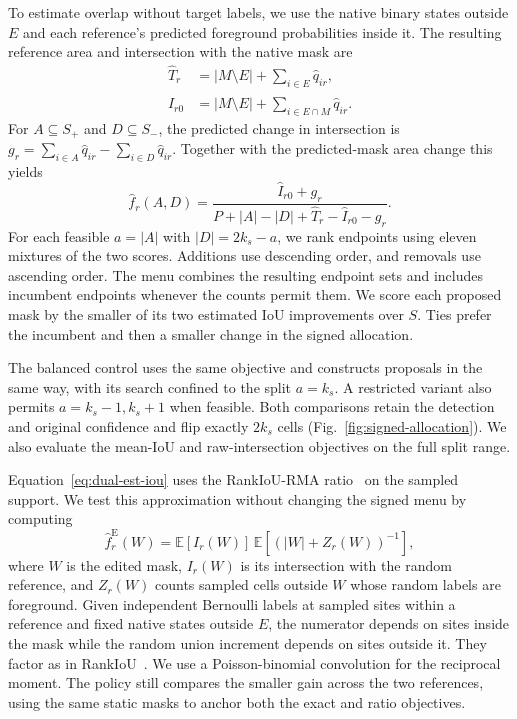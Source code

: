 \documentclass[journal]{IEEEtran}
\begin{document}
To estimate overlap without target labels, we use the native binary states outside \(E\) and each reference's predicted foreground probabilities inside it. The resulting reference area and intersection with the native mask are
\begin{equation}
\begin{aligned}
 \hat T_r&=|M\setminus E|+\sum_{i\in E}\hat q_{ir},\\
 \hat I_{r0}&=|M\setminus E|+\sum_{i\in E\cap M}\hat q_{ir}.
\end{aligned}
\label{eq:dual-area-proxy}
\end{equation}
For \(A\subseteq S_+\) and \(D\subseteq S_-\), the predicted change in intersection is \(g_r=\sum_{i\in A}\hat q_{ir}-\sum_{i\in D}\hat q_{ir}\). Together with the predicted-mask area change this yields
\begin{equation}
 \hat f_r(A,D)=
 \frac{\hat I_{r0}+g_r}{P+|A|-|D|+\hat T_r-\hat I_{r0}-g_r}.
 \label{eq:dual-est-iou}
\end{equation}
For each feasible \(a=|A|\) with \(|D|=2k_s-a\), we rank endpoints using eleven mixtures of the two scores. Additions use descending order, and removals use ascending order. The menu combines the resulting endpoint sets and includes incumbent endpoints whenever the counts permit them. We score each proposed mask by the smaller of its two estimated IoU improvements over \(S\). Ties prefer the incumbent and then a smaller change in the signed allocation.

The balanced control uses the same objective and constructs proposals in the same way, with its search confined to the split \(a=k_s\). A restricted variant also permits \(a=k_s-1,k_s+1\) when feasible. Both comparisons retain the detection and original confidence and flip exactly \(2k_s\) cells (Fig.~\ref{fig:signed-allocation}). We also evaluate the mean-IoU and raw-intersection objectives on the full split range.

Equation~\eqref{eq:dual-est-iou} uses the RankIoU-RMA ratio~\cite{rankrma} on the sampled support. We test this approximation without changing the signed menu by computing
\begin{equation}
 \hat f^{\mathrm{E}}_r(W)=\mathbb{E}[I_r(W)]\,
     \mathbb{E}\!\left[(|W|+Z_r(W))^{-1}\right],
 \label{eq:exact-iou-signed}
\end{equation}
where \(W\) is the edited mask, \(I_r(W)\) is its intersection with the random reference, and \(Z_r(W)\) counts sampled cells outside \(W\) whose random labels are foreground. Given independent Bernoulli labels at sampled sites within a reference and fixed native states outside \(E\), the numerator depends on sites inside the mask while the random union increment depends on sites outside it. They factor as in RankIoU~\cite{rankseg}. We use a Poisson-binomial convolution for the reciprocal moment. The policy still compares the smaller gain across the two references, using the same static masks to anchor both the exact and ratio objectives.
\end{document}
